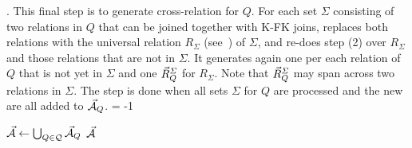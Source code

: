 \vspace{0.36ex}

. This final step is to generate cross-relation \bss
for $Q$. For each set $\Sigma$ consisting of two relations in $Q$
that can be joined together with K-FK joins, \usc replaces both
relations with the universal relation $R_{\Sigma}$
(see~\cite{AbHuVi1995}) of $\Sigma$, and re-does step (2) over
$R_{\Sigma}$ and those relations that are not in $\Sigma$. It
generates again one \bs per each relation of $Q$ that is not yet
in $\Sigma$ and one \bs $\vec{R}_{Q}^{\Sigma}$ for $R_{\Sigma}$. Note
that $\vec{R}_{Q}^{\Sigma}$ may span across two relations in $\Sigma$.
The step is done %
when all sets $\Sigma$ for $Q$ are processed
and the new \bss are all added to $\vec{{\mathcal A}}_{Q}$. \looseness = -1

\begin{myfloat}[t]
\vspace{1.2ex}
\begin{minipage}{0.50\textwidth}
  \removelatexerror
{\scriptsize
\setlength{\floatsep}{0cm} %
\setlength{\textfloatsep}{-2cm}%
\IncMargin{1em}
\vspace{-0.7ex}
\begin{algorithm}[H]
\Indentp{-2ex}
{}
\Indentp{1em}
\BlankLine
{}
$\vec{{\mathcal A}} \leftarrow \bigcup_{Q\in \mathcal Q} \vec{{\mathcal A}}_{Q}$\label{usc-l6}\;
\Return $\vec{{\mathcal A}}$\label{usc-l7}\;



\end{algorithm}}
\end{minipage}
\end{myfloat}
